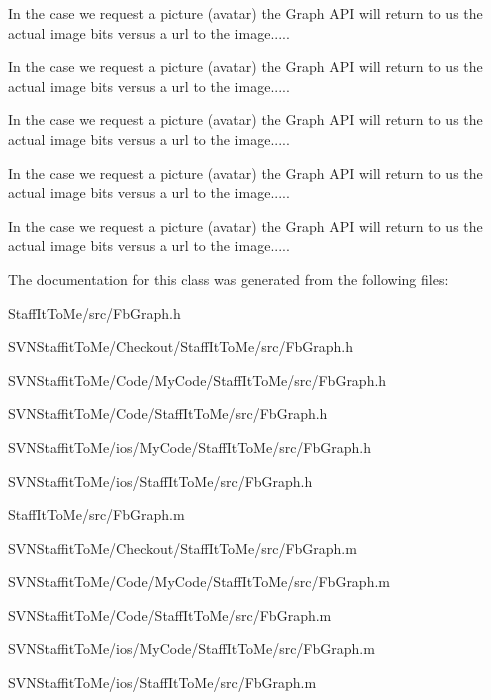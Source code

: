 \-In the case we request a picture (avatar) the \-Graph \-A\-P\-I will return to us the actual image bits versus a url to the image.....

\-In the case we request a picture (avatar) the \-Graph \-A\-P\-I will return to us the actual image bits versus a url to the image.....

\-In the case we request a picture (avatar) the \-Graph \-A\-P\-I will return to us the actual image bits versus a url to the image.....

\-In the case we request a picture (avatar) the \-Graph \-A\-P\-I will return to us the actual image bits versus a url to the image.....

\-In the case we request a picture (avatar) the \-Graph \-A\-P\-I will return to us the actual image bits versus a url to the image.....

\-The documentation for this class was generated from the following files\-:\begin{DoxyCompactItemize}
\item 
\-Staff\-It\-To\-Me/src/\-Fb\-Graph.\-h\item 
\-S\-V\-N\-Staffit\-To\-Me/\-Checkout/\-Staff\-It\-To\-Me/src/\-Fb\-Graph.\-h\item 
\-S\-V\-N\-Staffit\-To\-Me/\-Code/\-My\-Code/\-Staff\-It\-To\-Me/src/\-Fb\-Graph.\-h\item 
\-S\-V\-N\-Staffit\-To\-Me/\-Code/\-Staff\-It\-To\-Me/src/\-Fb\-Graph.\-h\item 
\-S\-V\-N\-Staffit\-To\-Me/ios/\-My\-Code/\-Staff\-It\-To\-Me/src/\-Fb\-Graph.\-h\item 
\-S\-V\-N\-Staffit\-To\-Me/ios/\-Staff\-It\-To\-Me/src/\-Fb\-Graph.\-h\item 
\-Staff\-It\-To\-Me/src/\-Fb\-Graph.\-m\item 
\-S\-V\-N\-Staffit\-To\-Me/\-Checkout/\-Staff\-It\-To\-Me/src/\-Fb\-Graph.\-m\item 
\-S\-V\-N\-Staffit\-To\-Me/\-Code/\-My\-Code/\-Staff\-It\-To\-Me/src/\-Fb\-Graph.\-m\item 
\-S\-V\-N\-Staffit\-To\-Me/\-Code/\-Staff\-It\-To\-Me/src/\-Fb\-Graph.\-m\item 
\-S\-V\-N\-Staffit\-To\-Me/ios/\-My\-Code/\-Staff\-It\-To\-Me/src/\-Fb\-Graph.\-m\item 
\-S\-V\-N\-Staffit\-To\-Me/ios/\-Staff\-It\-To\-Me/src/\-Fb\-Graph.\-m\end{DoxyCompactItemize}
